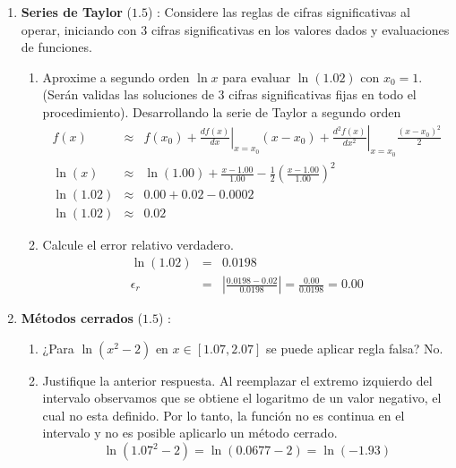 \documentclass[12pt]{article}
\begin{document}
  \begin{enumerate}[leftmargin=*,widest=9]
    \item \textbf{Series de Taylor} ($1.5$) : Considere las reglas de cifras significativas al operar, iniciando con 3 cifras significativas en los valores dados y evaluaciones de funciones.
    \begin{enumerate}[label=\alph*]
    \item Aproxime a segundo orden $\ln x$ para evaluar $\ln (1.02)$ con $x_0 = 1$. (Serán validas las soluciones de 3 cifras significativas fijas en todo el procedimiento).
    Desarrollando la serie de Taylor a segundo orden
    \begin{eqnarray*}
    f(x) & \approx & f(x_0) + \left.\frac{df(x)}{dx}\right|_{x=x_0}(x-x_0)+ \left.\frac{d^2f(x)}{dx^2}\right|_{x=x_0}\frac{(x-x_0)^2}{2}\\
    \ln(x) & \approx & \ln(1.00) + \frac{x-1.00}{1.00} - \frac{1}{2}\left(\frac{x-1.00}{1.00}\right)^2 \\
    \ln(1.02) & \approx & 0.00 + 0.02 - 0.0002\\
    \ln(1.02) & \approx & 0.02
    \end{eqnarray*}
    \item Calcule el error relativo verdadero.
    \begin{eqnarray*}
    \ln(1.02) & = & 0.0198\\
    \epsilon_r & = & \left| \frac{0.0198 - 0.02}{0.0198} \right| = \frac{0.00}{0.0198} = 0.00  
    \end{eqnarray*}
    \end{enumerate}
    \item \textbf{Métodos cerrados} ($1.5$) :
    \begin{enumerate}[label=\alph*]
    \item ¿Para $\ln (x^2-2)$ en $x \in \left[ 1.07, 2.07 \right]$ se puede aplicar regla falsa?
    No.
    \item Justifique la anterior respuesta.
    Al reemplazar el extremo izquierdo del intervalo observamos que se obtiene el logaritmo de un valor negativo, el cual no esta definido. Por lo tanto, la función no es continua en el intervalo y no es posible aplicarlo un método cerrado.
   \[ \ln(1.07^2 - 2) = \ln(0.0677 -2 ) = \ln(-1.93) \]

\end{enumerate}
\end{enumerate}
\end{document}
